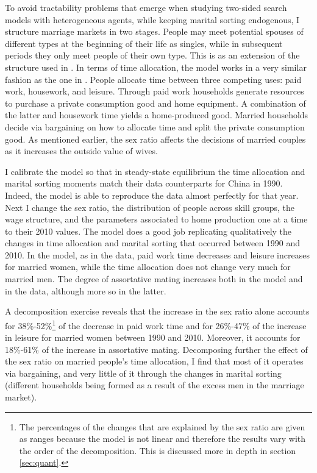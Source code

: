 \documentclass[12pt]{article}
\begin{document}
To avoid tractability problems that emerge when studying two-sided search models with heterogeneous agents, while keeping marital sorting endogenous, I structure marriage markets in two stages. People may meet potential spouses of different types at the beginning of their life as singles, while in subsequent periods they only meet people of their own type. This is as an extension of the structure used in \cite{fernandezetal05}. In terms of time allocation, the model works in a very similar fashion as the one in \cite{knowles13}. People allocate time between three competing uses: paid work, housework, and leisure. Through paid work households generate resources to purchase a private consumption good and home equipment. A combination of the latter and housework time yields a home-produced good. Married households decide via bargaining on how to allocate time and split the private consumption good. As mentioned earlier, the sex ratio affects the decisions of married couples as it increases the outside value of wives.

I calibrate the model so that in steady-state equilibrium the time allocation and marital sorting moments match their data counterparts for China in 1990. Indeed, the model is able to reproduce the data almost perfectly for that year. Next I change the sex ratio, the distribution of people across skill groups, the wage structure, and the parameters associated to home production one at a time to their 2010 values. The model does a good job replicating qualitatively the changes in time allocation and marital sorting that occurred between 1990 and 2010. In the model, as in the data, paid work time decreases and leisure increases for married women, while the time allocation does not change very much for married men. The degree of assortative mating increases both in the model and in the data, although more so in the latter. 

A decomposition exercise reveals that the increase in the sex ratio alone accounts for 38\%-52\%\footnote{The percentages of the changes that are explained by the sex ratio are given as ranges because the model is not linear and therefore the results vary with the order of the decomposition. This is discussed more in depth in section \ref{sec:quant}.} of the decrease in paid work time and for 26\%-47\% of the increase in leisure for married women between 1990 and 2010. Moreover, it accounts for 18\%-61\% of the increase in assortative mating. Decomposing further the effect of the sex ratio on married people's time allocation, I find that most of it operates via bargaining, and very little of it through the changes in marital sorting (different households being formed as a result of the excess men in the marriage market).
\end{document}
